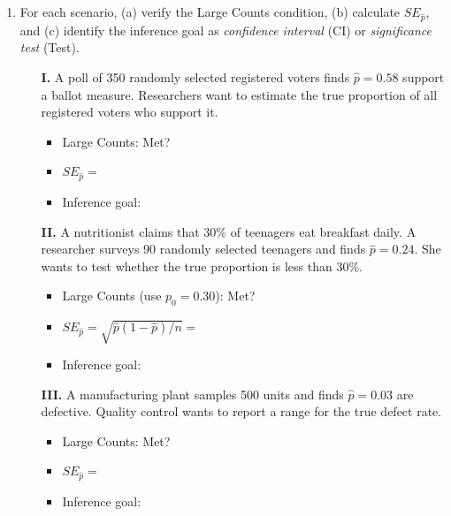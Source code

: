 \documentclass[10pt]{article}
\begin{document}
\namedateperiod

\vspace{0.15in}

\begin{enumerate}

  \item For each scenario, (a) verify the Large Counts condition, (b) calculate $SE_{\hat p}$,
        and (c) identify the inference goal as \emph{confidence interval} (CI) or
        \emph{significance test} (Test).

        \begin{enumerate}[label=\alph*.]
          \item[\textbf{I.}] A poll of 350 randomly selected registered voters finds $\hat p = 0.58$
                support a ballot measure. Researchers want to estimate the true proportion
                of all registered voters who support it.
                \begin{itemize}
                  \item Large Counts: \blank{7cm} \quad Met? \blank{1.5cm}
                  \item $SE_{\hat p} = $ \blank{6cm}
                  \item Inference goal: \blank{4cm}
                \end{itemize}

          \item[\textbf{II.}] A nutritionist claims that 30\% of teenagers eat breakfast daily.
                A researcher surveys 90 randomly selected teenagers and finds $\hat p = 0.24$.
                She wants to test whether the true proportion is less than 30\%.
                \begin{itemize}
                  \item Large Counts (use $p_0 = 0.30$): \blank{5.5cm} \quad Met? \blank{1.5cm}
                  \item $SE_{\hat p} = \sqrt{\hat p(1-\hat p)/n} = $ \blank{5cm}
                  \item Inference goal: \blank{4cm}
                \end{itemize}

          \item[\textbf{III.}] A manufacturing plant samples 500 units and finds $\hat p = 0.03$
                are defective. Quality control wants to report a range for the true defect rate.
                \begin{itemize}
                  \item Large Counts: \blank{7cm} \quad Met? \blank{1.5cm}
                  \item $SE_{\hat p} = $ \blank{6cm}
                  \item Inference goal: \blank{4cm}
                \end{itemize}
        \end{enumerate}


\end{enumerate}
\end{document}
